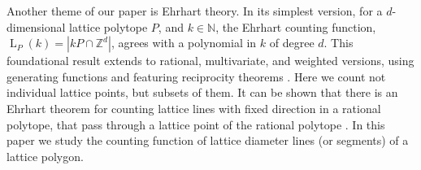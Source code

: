 \documentclass[11pt]{article}
\newcommand{\bu}{\mathbf{u}}
\newcommand{\Z}{\mathbb{Z}}
\newcommand{\N}{\mathbb{N}}
\DeclareMathOperator{\Ehr}{L}
\begin{document}



Another theme of our paper is Ehrhart theory. In its simplest version, for a $d$-dimensional lattice polytope $P$, and $k \in \N$, the Ehrhart counting function, $\Ehr_P(k) = |kP \cap \Z^d|$, agrees with a polynomial in $k$ of degree $d$. This foundational result extends to rational, multivariate, and weighted versions, using generating functions and featuring reciprocity theorems \cite{beckrobins}. Here we count not individual lattice points, but subsets of them.
It can be shown that there is an Ehrhart theorem for counting lattice lines with fixed direction in a rational polytope, that pass through a lattice point of the rational polytope \cite{aebThesis}.
In this paper we study the counting function of lattice diameter lines (or segments) of a lattice polygon.
\end{document}
